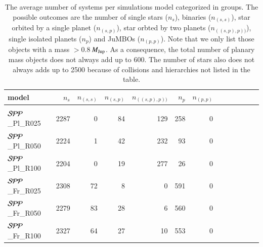 \documentclass[submission,phys]{lib/SciPost}
\newcommand{\MJup}{\mbox{${M}_{\rm Jup}$}}
\newcommand{\jumbos}{\mbox{JuMBOs}}
\begin{document}
\begin{table}
  \caption{The average number of systems per simulations model
    categorized in groups.  The possible outcomes are the number of
    single stars ($n_{s}$), binaries ($n_{(s,s)}$), star orbited by a
    single planet ($n_{(s,p)}$), star orbted by two planets
    ($n_{((s,p),p))}$), single isolated planets ($n_{p}$) and \jumbos
    ($n_{(p,p)}$).  Note that we only list those objects with a mass
    $>0.8$\,\MJup.  As a consequence, the total number of planary mass
    objects does not always add up to 600.  The number of stars also
    does not always adds up to 2500 because of collisions and
    hierarchies not listed in the table.}
 \label{Tab:model_numbers}
 \centering 
 \begin{tabular}{lrrrrrrrrrrrr}
   \hline\hline
   model & $n_{s}$ & $n_{(s,s)}$ & $n_{(s,p)}$ & $n_{((s,p),p))}$ & $n_{p}$ & $n_{(p,p)}$ \\
        \hline \vspace{-0.75em}\\
${\cal SPP}$\_Pl\_R025 &  2287 &  0 & 84 & 129 & 258 & 0 \\
${\cal SPP}$\_Pl\_R050 &  2224 &  1 & 42 & 232 &  93 & 0 \\
${\cal SPP}$\_Pl\_R100 &  2204 &  0 & 19 & 277 &  26 & 0 \\
${\cal SPP}$\_Fr\_R025 &  2308 & 72 &  8 &   0 & 591 & 0 \\  
${\cal SPP}$\_Fr\_R050 &  2279 & 83 & 28 &   6 & 560 & 0 \\ 
${\cal SPP}$\_Fr\_R100 &  2327 & 64 & 27 &  10 & 553 & 0 \\


\end{tabular}
\end{table}
\end{document}
